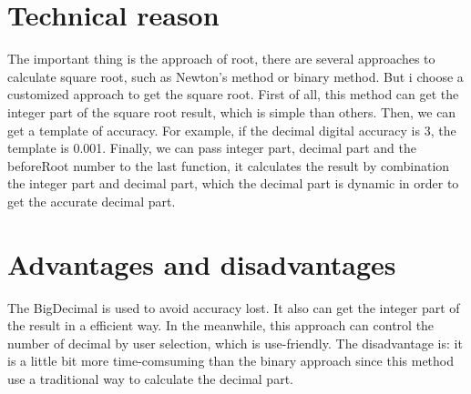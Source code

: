 \documentclass{report}
\begin{document}
\section*{Technical reason}
The important thing is the approach of root, there are several approaches to calculate square root, such as Newton's method or binary method. But i choose a customized approach to get the square root.
First of all, this method can get the integer part of the square root result, which is simple than others. Then, we can get a template of accuracy. For example, if the decimal digital accuracy is 3, the template is 0.001. Finally, we can pass integer part, decimal part and the beforeRoot number to the last function, it calculates the result by combination the integer part and decimal part, which the decimal part is dynamic in order to get the accurate decimal part.
\section*{Advantages and disadvantages}
The BigDecimal is used to avoid accuracy lost. It also can get the integer part of the result in a efficient way. In the meanwhile, this approach can control the number of decimal by user selection, which is use-friendly. The disadvantage is: it is a little bit more time-comsuming than the binary approach since this method use a traditional way to calculate the decimal part.
\end{document}
